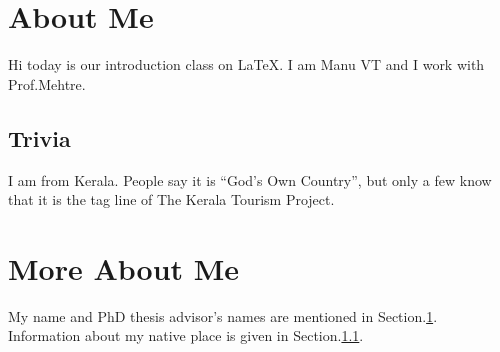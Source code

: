 \documentclass[12pt]{article}
\title{}
\author{}
\date{}
\begin{document}
\maketitle


\section{About Me}\label{sec:cg}
Hi today is our introduction class on \LaTeX.
I am Manu VT and I work with Prof.Mehtre.
\subsection{Trivia}\label{sec:sb}
I am from Kerala. People say it is ``God's Own Country'', but only a few know that it is the tag line of The Kerala Tourism Project. 
\section{More About Me}\label{sec:ex}
My name and PhD thesis advisor's names are mentioned in Section.\ref{sec:cg}.
Information about my native place is given in Section.\ref{sec:sb}.
\end{document}
